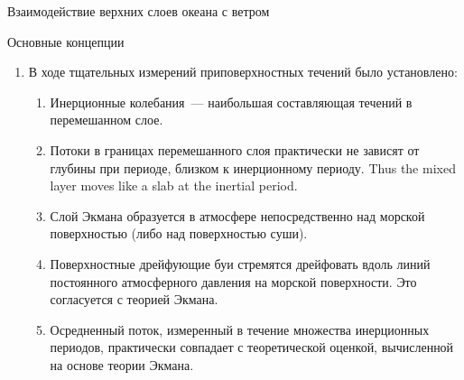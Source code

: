 \begin{chapter}{Взаимодействие верхних слоев океана с ветром}
\begin{section}{Основные концепции}
\begin{enumerate}
\begin{enumerate}
\item 
\textit{Скорость поверхностного течения}: $1$--$2.5\%$~скорости ветра 
в зависимости от широты.
%

\item 
\textit{Глубина}: приблизительно~$40$--$300\m$ в зависимости от широты
и скорости ветра.
%
\end{enumerate}

\item 
В ходе тщательных измерений приповерхностных течений было установлено:
%
%
  \begin{enumerate}
   \item 
    Инерционные колебания~--- наибольшая составляющая течений
    в перемешанном слое.
%

   \item Потоки в границах перемешанного 
    слоя практически не зависят 
    от глубины при периоде, близком к инерционному 
    периоду. Thus the mixed layer moves
    like a slab at the inertial period.
%

   \item Слой Экмана образуется в атмосфере непосредственно над морской 
    поверхностью (либо над поверхностью суши).
%

   \item Поверхностные дрейфующие буи 
    стремятся дрейфовать вдоль линий постоянного атмосферного давления
    на морской поверхности. Это согласуется с теорией Экмана.
%

   \item Осредненный поток, измеренный в течение множества инерционных периодов,
    практически совпадает с теоретической оценкой, вычисленной на основе
    теории Экмана.
%
\end{enumerate}


\end{enumerate}
\end{section}
\end{chapter}
